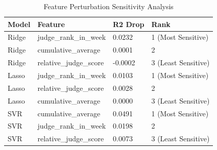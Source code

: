 
\begin{table}[h]
\centering
\caption{Feature Perturbation Sensitivity Analysis}
\label{tab:feature_perturbation}
\begin{tabular}{llll}
\toprule
\textbf{Model} & \textbf{Feature} & \textbf{R2 Drop} & \textbf{Rank} \\
\midrule
Ridge & judge_rank_in_week & 0.0232 & 1 (Most Sensitive) \\
Ridge & cumulative_average & 0.0001 & 2 \\
Ridge & relative_judge_score & -0.0002 & 3 (Least Sensitive) \\
Lasso & judge_rank_in_week & 0.0103 & 1 (Most Sensitive) \\
Lasso & relative_judge_score & 0.0028 & 2 \\
Lasso & cumulative_average & 0.0000 & 3 (Least Sensitive) \\
SVR & cumulative_average & 0.0491 & 1 (Most Sensitive) \\
SVR & judge_rank_in_week & 0.0198 & 2 \\
SVR & relative_judge_score & 0.0073 & 3 (Least Sensitive) \\
\bottomrule
\end{tabular}
\end{table}
